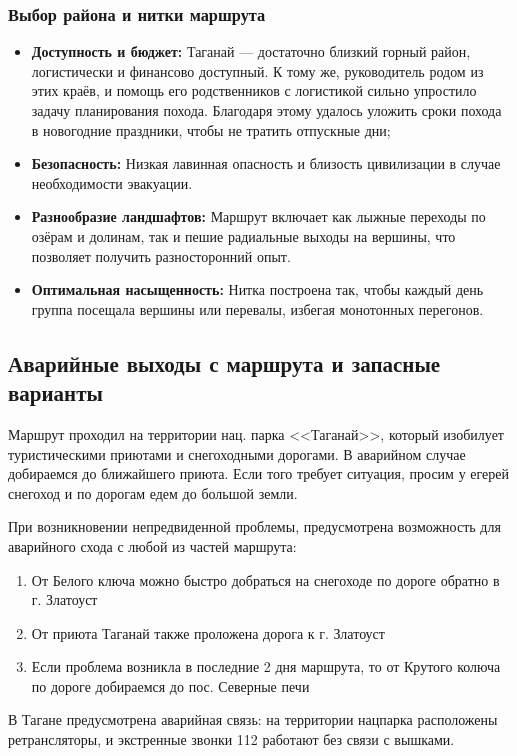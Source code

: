 \subsubsection{Выбор района и нитки маршрута}
\begin{itemize}
	\item \textbf{Доступность и бюджет:} Таганай — достаточно близкий горный район, логистически и финансово доступный. К тому же, руководитель родом из этих краёв, и помощь его родственников с логистикой сильно упростило задачу планирования похода. Благодаря этому удалось уложить сроки похода в новогодние праздники, чтобы не тратить отпускные дни;
	\item \textbf{Безопасность:} Низкая лавинная опасность и близость цивилизации в случае необходимости эвакуации.
	\item \textbf{Разнообразие ландшафтов:} Маршрут включает как лыжные переходы по озёрам и долинам, так и пешие радиальные выходы на вершины, что позволяет получить разносторонний опыт.
	\item \textbf{Оптимальная насыщенность:} Нитка построена так, чтобы каждый день группа посещала вершины или перевалы, избегая монотонных перегонов.
\end{itemize}

\subsection{Аварийные выходы с маршрута и запасные варианты}

Маршрут проходил на территории нац. парка <<Таганай>>, который изобилует туристическими приютами и снегоходными дорогами. В аварийном случае добираемся до ближайшего приюта. Если того требует ситуация, просим у егерей снегоход и по дорогам едем до большой земли. 

При возникновении непредвиденной проблемы, предусмотрена возможность для аварийного схода с любой из частей маршрута:

\begin{enumerate}
	\item От Белого ключа можно быстро добраться на снегоходе по дороге обратно в г. Златоуст
	\item От приюта Таганай также проложена дорога к г. Златоуст
	\item Если проблема возникла в последние 2 дня маршрута, то от Крутого колюча по дороге добираемся до пос. Северные печи
\end{enumerate}

В Тагане предусмотрена аварийная связь: на территории нацпарка расположены ретрансляторы, и экстренные звонки 112 работают без связи с вышками.

